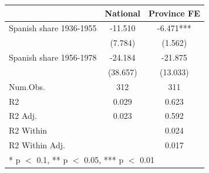 \begin{table}
\centering
\begin{tabular}[t]{lcc}
\toprule
  & National & Province FE\\
\midrule
Spanish share 1936-1955 & -11.510 & -6.471***\\
 & (7.784) & (1.562)\\
Spanish share 1956-1978 & -24.184 & -21.875\\
 & (38.657) & (13.033)\\
\midrule
Num.Obs. & 312 & 311\\
R2 & 0.029 & 0.623\\
R2 Adj. & 0.023 & 0.592\\
R2 Within &  & 0.024\\
R2 Within Adj. &  & 0.017\\
\bottomrule
\multicolumn{3}{l}{\rule{0pt}{1em}* p $<$ 0.1, ** p $<$ 0.05, *** p $<$ 0.01}\\
\end{tabular}
\end{table}
